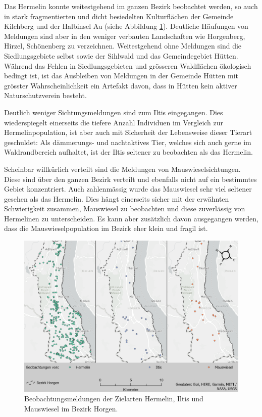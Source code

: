 \documentclass[
  oneside]{scrbook}
\begin{document}
Das Hermelin konnte weitestgehend im ganzen Bezirk beobachtet werden, so auch in stark fragmentierten und dicht besiedelten Kulturflächen der Gemeinde Kilchberg und der Halbinsel Au (siehe Abbildung \ref{fig:layoutbeobachtungsmeldungen}). Deutliche Häufungen von Meldungen sind aber in den weniger verbauten Landschaften wie Horgenberg, Hirzel, Schönenberg zu verzeichnen. Weitestgehend ohne Meldungen sind die Siedlungsgebiete selbst sowie der Sihlwald und das Gemeindegebiet Hütten. Während das Fehlen in Siedlungsgebieten und grösseren Waldflächen ökologisch bedingt ist, ist das Ausbleiben von Meldungen in der Gemeinde Hütten mit grösster Wahrscheinlichkeit ein Artefakt davon, dass in Hütten kein aktiver Naturschutzverein besteht.

Deutlich weniger Sichtungsmeldungen sind zum Iltis eingegangen. Dies wiederspiegelt einerseits die tiefere Anzahl Individuen im Vergleich zur Hermelinpopulation, ist aber auch mit Sicherheit der Lebensweise dieser Tierart geschuldet: Als dämmerungs- und nachtaktives Tier, welches sich auch gerne im Waldrandbereich aufhaltet, ist der Iltis seltener zu beobachten als das Hermelin.

Scheinbar willkürlich verteilt sind die Meldungen von Mauswieselsichtungen. Diese sind über den ganzen Bezirk verteilt und ebenfalls nicht auf ein bestimmtes Gebiet konzentriert. Auch zahlenmässig wurde das Mauswiesel sehr viel seltener gesehen als das Hermelin. Dies hängt einerseits sicher mit der erwähnten Schwierigkeit zusammen, Mauswiesel zu beobachten und diese zuverlässig von Hermelinen zu unterscheiden. Es kann aber zusätzlich davon ausgegangen werden, dass die Mauswieselpopulation im Bezirk eher klein und fragil ist.



\begin{figure}
\includegraphics[width=1\linewidth]{images/Layout_Beobachtungsmeldungen} \caption{Beobachtungsmeldungen der Zielarten Hermelin, Iltis und Mauswiesel im Bezirk Horgen.}\label{fig:layoutbeobachtungsmeldungen}
\end{figure}
\end{document}
